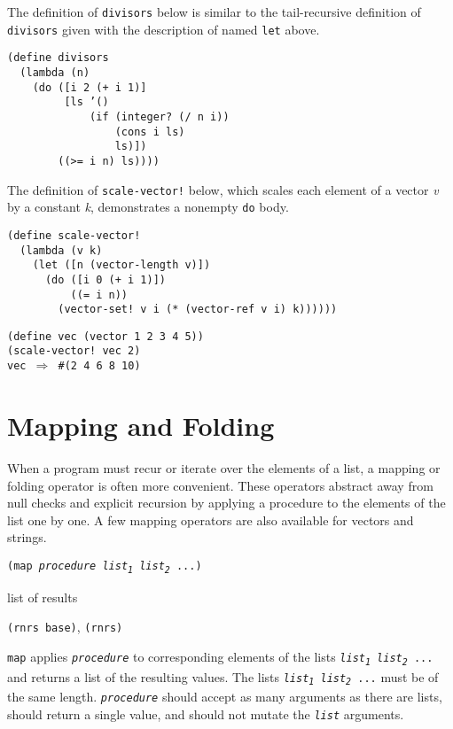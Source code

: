 The definition of \label{control_s29}\texttt{divisors} below is
similar to the tail-recursive definition of \texttt{divisors} given
with the description of named \texttt{let} above.


\begin{alltt}
(define divisors
  (lambda (n)
    (do ([i 2 (+ i 1)]
         [ls '()
             (if (integer? (/ n i))
                 (cons i ls)
                 ls)])
        ((\textgreater{}= i n) ls))))
\end{alltt}


The definition of \texttt{scale-vector!} below, which scales each
element of a vector \textit{v} by a constant \textit{k}, demonstrates a nonempty
\texttt{do} body.


\begin{alltt}
(define scale-vector!
  (lambda (v k)
    (let ([n (vector-length v)])
      (do ([i 0 (+ i 1)])
          ((= i n))
        (vector-set! v i (* (vector-ref v i) k))))))

(define vec (vector 1 2 3 4 5))
(scale-vector! vec 2)
vec \(\Rightarrow\) \#{}(2 4 6 8 10)
\end{alltt}

\section{\label{control_g101}\label{control_h5}Mapping and Folding}



When a program must recur or iterate over the elements of a list, a mapping
or folding operator is often more convenient.
These operators abstract away from null checks and explicit recursion by
applying a procedure to the elements of the list one by one.
A few mapping operators are also available for vectors and strings.


\begin{description}

\label{control_s30}\item[procedure] \texttt{(map \textit{procedure} \textit{list\textsubscript{1}} \textit{list\textsubscript{2}} ...)}



\item[returns] list of results


\item[libraries] \texttt{(rnrs base)}, \texttt{(rnrs)}
\end{description}


\label{control_s31}\label{control_s32}\texttt{map} applies \texttt{\textit{procedure}} to corresponding
elements of the lists \texttt{\textit{list\textsubscript{1}} \textit{list\textsubscript{2}} ...} and returns a
list of the resulting values.
The lists \texttt{\textit{list\textsubscript{1}} \textit{list\textsubscript{2}} ...} must be of the same length.
\texttt{\textit{procedure}} should accept as many arguments as there are lists, should
return a single value, and should not mutate the \texttt{\textit{list}} arguments.



